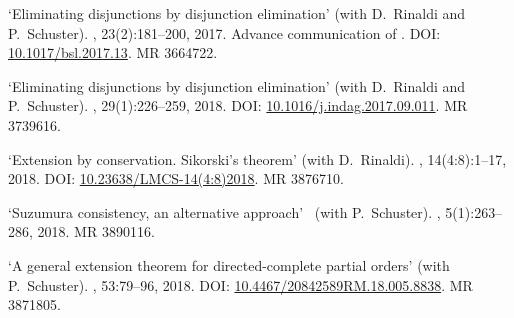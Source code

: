 \documentclass[a4paper]{article}
\begin{document}
\thispagestyle{empty}

%
%
%
%

\renewcommand\refname{Publications}

\renewcommand{\bibnumfmt}[1]{#1.}


% 
\begin{flushleft}

\begin{thebibliography}{10}

\newblock `Eliminating disjunctions by disjunction elimination' (with D.~Rinaldi and P.~Schuster).
, 23(2):181--200, 2017. Advance communication of \cite{rin:edde:full}.
\newblock DOI: \href{https://doi.org/10.1017/bsl.2017.13}{10.1017/bsl.2017.13}.
\newblock MR 3664722.

\newblock `Eliminating disjunctions by disjunction elimination' (with D.~Rinaldi and P.~Schuster).
, 29(1):226--259, 2018. %
\newblock DOI: \href{https://doi.org/10.1016/j.indag.2017.09.011}{10.1016/j.indag.2017.09.011}.
\newblock MR 3739616.

\newblock `Extension by conservation. {Sikorski's} theorem' (with D.~Rinaldi).
, 14(4:8):1--17, 2018.
\newblock DOI: \href{https://doi.org/10.23638/LMCS-14(4:8)2018}{10.23638/LMCS-14(4:8)2018}.
\newblock MR 3876710.

\newblock `{Suzumura} consistency, an alternative approach'~ (with P.~Schuster).
, 5(1):263--286, 2018.
\newblock MR 3890116.

\newblock `A general extension theorem for directed-complete partial orders' (with P.~Schuster).
, 53:79--96, 2018.
\newblock DOI: \href{https://doi.org/10.4467/20842589RM.18.005.8838}{10.4467/20842589RM.18.005.8838}.
\newblock MR 3871805.


\end{thebibliography}
\end{flushleft}
\end{document}
